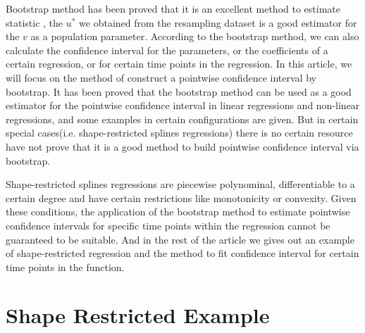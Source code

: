 \documentclass[12pt]{article}
\begin{document}
Bootstrap method has been proved that it is an excellent method to estimate statistic \cite{efron1979bootstrap}, the \(u^*\) we obtained from the resampling dataset is a good estimator for the \(v\) as a population parameter. According to the bootstrap method, we can also calculate the confidence interval for the parameters, or the coefficients of a certain regression, or for certain time points in the regression. In this article, we will focus on the method of construct a pointwise confidence interval by bootstrap. It has been proved that the bootstrap method can be used as a good estimator for the pointwise confidence interval in linear regressions and non-linear regressions\cite{efron1979bootstrap}\cite{davidson1999bootstrap}, and some examples in certain configurations are given.\cite{ruhe2019bootstrap}\cite{ma2019inference}\cite{dugas2010pointwise} But in certain special cases(i.e. shape-restricted splines regressions) there is no certain resource have not prove that it is a good method to build pointwise confidence interval via bootstrap.

Shape-restricted splines regressions are piecewise polynominal, differentiable to a certain degree and have certain restrictions like monotonicity or convexity.\cite{meyer2008inference} Given these conditions, the application of the bootstrap method to estimate pointwise confidence intervals for specific time points within the regression cannot be guaranteed to be suitable. And in the rest of the article we gives out an example of shape-restricted regression and the method to fit confidence interval for certain time points in the function.









\section{Shape Restricted Example}
\label{Shape Restricted Example}
\end{document}
